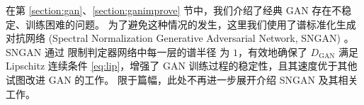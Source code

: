 在第 \ref{section:gan}、\ref{section:ganimprove} 节中，我们介绍了经典 GAN 存在不稳定、训练困难的问题。
为了避免这种情况的发生，这里我们使用了谱标准化生成对抗网络 (Spectral Normalization Generative Adversarial Network, SNGAN)
\cite{sngan}。SNGAN 通过
限制判定器网络中每一层的谱半径
为 $1$，有效地确保了 $D_{\text{GAN}}$ 满足 Lipschitz 连续条件 \eqref{eq:lip}，增强了 GAN 训练过程的稳定性，且其速度优于其他试图改进 GAN 的工作。
限于篇幅，此处不再进一步展开介绍 SNGAN 及其相关工作。


